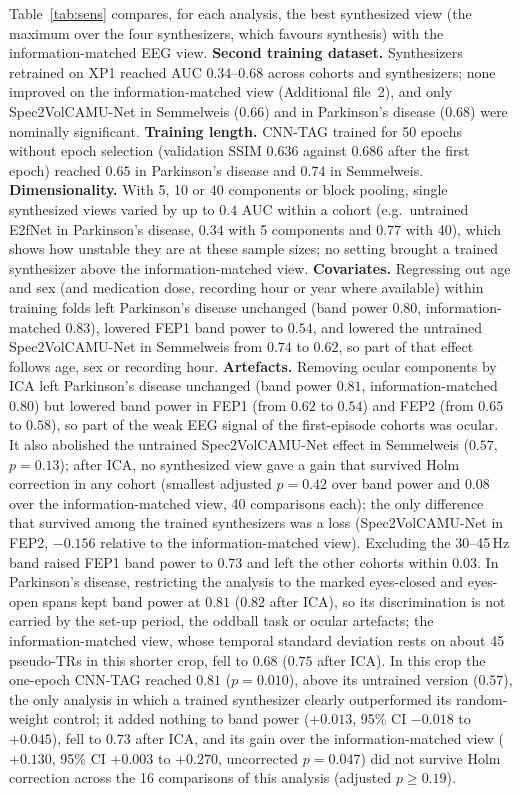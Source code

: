 Table~\ref{tab:sens} compares, for each analysis, the best synthesized view (the maximum over the four synthesizers, which favours synthesis) with the information-matched EEG view. \textbf{Second training dataset.} Synthesizers retrained on XP1 reached AUC 0.34--0.68 across cohorts and synthesizers; none improved on the information-matched view (Additional file~2), and only Spec2VolCAMU-Net in Semmelweis ($0.66$) and in Parkinson's disease ($0.68$) were nominally significant. \textbf{Training length.} CNN-TAG trained for 50 epochs without epoch selection (validation SSIM $0.636$ against $0.686$ after the first epoch) reached $0.65$ in Parkinson's disease and $0.74$ in Semmelweis. \textbf{Dimensionality.} With 5, 10 or 40 components or block pooling, single synthesized views varied by up to $0.4$ AUC within a cohort (e.g.\ untrained E2fNet in Parkinson's disease, $0.34$ with 5 components and $0.77$ with 40), which shows how unstable they are at these sample sizes; no setting brought a trained synthesizer above the information-matched view. \textbf{Covariates.} Regressing out age and sex (and medication dose, recording hour or year where available) within training folds left Parkinson's disease unchanged (band power $0.80$, information-matched $0.83$), lowered FEP1 band power to $0.54$, and lowered the untrained Spec2VolCAMU-Net in Semmelweis from $0.74$ to $0.62$, so part of that effect follows age, sex or recording hour. \textbf{Artefacts.} Removing ocular components by ICA left Parkinson's disease unchanged (band power $0.81$, information-matched $0.80$) but lowered band power in FEP1 (from $0.62$ to $0.54$) and FEP2 (from $0.65$ to $0.58$), so part of the weak EEG signal of the first-episode cohorts was ocular. It also abolished the untrained Spec2VolCAMU-Net effect in Semmelweis ($0.57$, $p=0.13$); after ICA, no synthesized view gave a gain that survived Holm correction in any cohort (smallest adjusted $p=0.42$ over band power and $0.08$ over the information-matched view, 40 comparisons each); the only difference that survived among the trained synthesizers was a loss (Spec2VolCAMU-Net in FEP2, $-0.156$ relative to the information-matched view). Excluding the 30--45\,Hz band raised FEP1 band power to $0.73$ and left the other cohorts within $0.03$. In Parkinson's disease, restricting the analysis to the marked eyes-closed and eyes-open spans kept band power at $0.81$ ($0.82$ after ICA), so its discrimination is not carried by the set-up period, the oddball task or ocular artefacts; the information-matched view, whose temporal standard deviation rests on about 45 pseudo-TRs in this shorter crop, fell to $0.68$ ($0.75$ after ICA). In this crop the one-epoch CNN-TAG reached $0.81$ ($p=0.010$), above its untrained version ($0.57$), the only analysis in which a trained synthesizer clearly outperformed its random-weight control; it added nothing to band power ($+0.013$, 95\% CI $-0.018$ to $+0.045$), fell to $0.73$ after ICA, and its gain over the information-matched view ($+0.130$, 95\% CI $+0.003$ to $+0.270$, uncorrected $p=0.047$) did not survive Holm correction across the 16 comparisons of this analysis (adjusted $p\geq0.19$).

